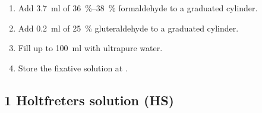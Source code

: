 \documentclass[10pt]{report}
\begin{document}
\begin{enumerate}
	\item Add \qty{3.7}{\ml} of \qtyrange{36}{38}{\percent} formaldehyde to a graduated cylinder.
	\item Add \qty{0.2}{\ml} of \qty{25}{\percent} gluteraldehyde to a graduated cylinder.
	\item Fill up to \qty{100}{\ml} with ultrapure water.
	\item Store the fixative solution at \fourdegree.
\end{enumerate}

\subsection*{1\per{} Holtfreter\curlyapostrophe s solution (HS)}
\end{document}
